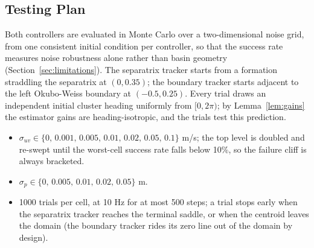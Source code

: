 \documentclass[lettersize,journal]{IEEEtran}
\begin{document}
\subsection{Testing Plan}
\label{sec:test_plan}

Both controllers are evaluated in Monte Carlo over a two-dimensional
noise grid, from one consistent initial condition per controller, so
that the success rate measures noise robustness alone rather than basin
geometry (Section~\ref{sec:limitations}). The separatrix tracker starts
from a formation straddling the separatrix at $(0, 0.35)$; the boundary
tracker starts adjacent to the left Okubo-Weiss boundary at
$(-0.5, 0.25)$. Every trial draws an independent initial cluster heading
uniformly from $[0, 2\pi)$; by Lemma~\ref{lem:gains} the estimator gains
are heading-isotropic, and the trials test this prediction.
\begin{itemize}
    \item $\sigma_{uv} \in \{0,\, 0.001,\, 0.005,\, 0.01,\, 0.02,\,
          0.05,\, 0.1\}$ m/s; the top level is doubled and re-swept
          until the worst-cell success rate falls below 10\%, so the
          failure cliff is always bracketed.
    \item $\sigma_p \in \{0,\, 0.005,\, 0.01,\, 0.02,\, 0.05\}$ m.
    \item 1000 trials per cell, at 10 Hz for at most 500 steps; a trial
          stops early when the separatrix tracker reaches the terminal
          saddle, or when the centroid leaves the domain (the boundary
          tracker rides its zero line out of the domain by design).
\end{itemize}
\end{document}
